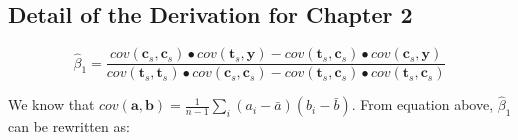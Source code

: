 




\begin{appendices}
\chapter{Detail of the Derivation for Chapter 2}

\begin{equation}\label{ap:eq1}
\hat{\beta }_{1}=\frac{cov\left( \mathbf{c}_{s},\mathbf{c}_{s} \right)\bullet cov\left( \mathbf{t}_{s},\mathbf{y} \right)-cov\left( \mathbf{t}_{s},\mathbf{c}_{s} \right)\bullet cov\left( \mathbf{c}_{s},\mathbf{y} \right)}{cov\left( \mathbf{t}_{s},\mathbf{t}_{s} \right)\bullet cov\left( \mathbf{c}_{s},\mathbf{c}_{s} \right)-cov\left( \mathbf{t}_{s},\mathbf{c}_{s} \right)\bullet cov\left( \mathbf{t}_{s},\mathbf{c}_{s} \right)}
\end{equation}

We know that $cov\left( \mathbf{a},\mathbf{b}\right)=\frac{1}{n-1}\sum\nolimits_i {\left( a_{i}-\bar{a} \right)\left(
b_{i}-\bar{b} \right)} $. From equation above, $\hat{\beta }_{1}$ can be rewritten as:


\end{appendices}
